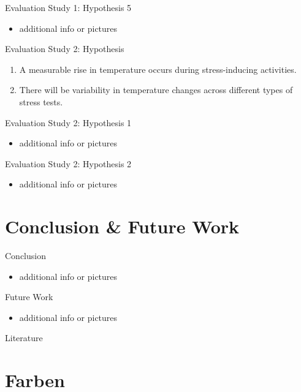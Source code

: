 \documentclass[en]{sdqbeamer}
\begin{document}
\begin{frame}{Evaluation Study 1: Hypothesis 5}
    \begin{itemize}
        \item additional info or pictures
    \end{itemize}
\end{frame}

\begin{frame}{Evaluation Study 2: Hypothesis}
    \begin{enumerate}[label=H\arabic{*}:]
      \item A measurable rise in temperature occurs during stress-inducing activities.
      \item There will be variability in temperature changes across different types of stress tests.
    \end{enumerate}
\end{frame}

\begin{frame}{Evaluation Study 2: Hypothesis 1}
    \begin{itemize}
        \item additional info or pictures
    \end{itemize}
\end{frame}

\begin{frame}{Evaluation Study 2: Hypothesis 2}
    \begin{itemize}
        \item additional info or pictures
    \end{itemize}
\end{frame}

\section{Conclusion \& Future Work}
\begin{frame}{Conclusion}
    \begin{itemize}
        \item additional info or pictures
    \end{itemize}
\end{frame}

\begin{frame}{Future Work}
    \begin{itemize}
        \item additional info or pictures
    \end{itemize}
\end{frame}

\appendix
\beginbackup



\begin{frame}{Literature}
    \printbibliography
\end{frame}

\section{Farben}
\backupend
\end{document}
